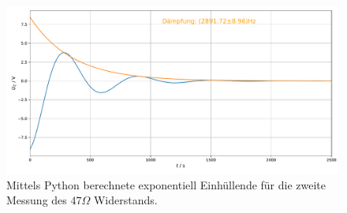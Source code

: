 \documentclass[a4paper, 12pt]{scrartcl}
\begin{document}
\begin{figure}[h]
\centering
\includegraphics[width=\textwidth]{plots/einhuellend/exp_einhuellend5_2.pdf}
\caption{Mittels Python berechnete exponentiell Einhüllende für die zweite Messung des $47\Omega$ Widerstands.}
\end{figure}
\end{document}
